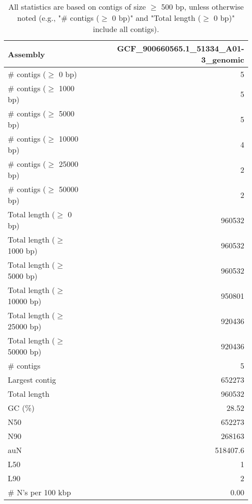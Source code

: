 \documentclass[12pt,a4paper]{article}
\begin{document}
\begin{table}[ht]
\begin{center}
\caption{All statistics are based on contigs of size $\geq$ 500 bp, unless otherwise noted (e.g., "\# contigs ($\geq$ 0 bp)" and "Total length ($\geq$ 0 bp)" include all contigs).}
\begin{tabular}{|l*{1}{|r}|}
\hline
Assembly & GCF\_900660565.1\_51334\_A01-3\_genomic \\ \hline
\# contigs ($\geq$ 0 bp) & 5 \\ \hline
\# contigs ($\geq$ 1000 bp) & 5 \\ \hline
\# contigs ($\geq$ 5000 bp) & 5 \\ \hline
\# contigs ($\geq$ 10000 bp) & 4 \\ \hline
\# contigs ($\geq$ 25000 bp) & 2 \\ \hline
\# contigs ($\geq$ 50000 bp) & 2 \\ \hline
Total length ($\geq$ 0 bp) & 960532 \\ \hline
Total length ($\geq$ 1000 bp) & 960532 \\ \hline
Total length ($\geq$ 5000 bp) & 960532 \\ \hline
Total length ($\geq$ 10000 bp) & 950801 \\ \hline
Total length ($\geq$ 25000 bp) & 920436 \\ \hline
Total length ($\geq$ 50000 bp) & 920436 \\ \hline
\# contigs & 5 \\ \hline
Largest contig & 652273 \\ \hline
Total length & 960532 \\ \hline
GC (\%) & 28.52 \\ \hline
N50 & 652273 \\ \hline
N90 & 268163 \\ \hline
auN & 518407.6 \\ \hline
L50 & 1 \\ \hline
L90 & 2 \\ \hline
\# N's per 100 kbp & 0.00 \\ \hline
\end{tabular}
\end{center}
\end{table}
\end{document}
